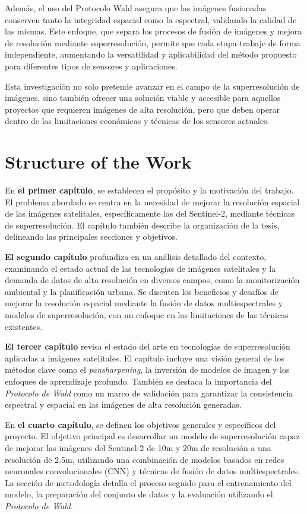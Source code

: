 Además, el uso del Protocolo Wald asegura que las imágenes fusionadas conserven tanto la integridad espacial como la espectral, validando la calidad de las mismas. Este enfoque, que separa los procesos de fusión de imágenes y mejora de resolución mediante superresolución, permite que cada etapa trabaje de forma independiente, aumentando la versatilidad y aplicabilidad del método propuesto para diferentes tipos de sensores y aplicaciones.

Esta investigación no solo pretende avanzar en el campo de la superresolución de imágenes, sino también ofrecer una solución viable y accesible para aquellos proyectos que requieren imágenes de alta resolución, pero que deben operar dentro de las limitaciones económicas y técnicas de los sensores actuales.


\section{Structure of the Work}


En \textbf{el primer capítulo}, se establecen el propósito y la motivación del trabajo. El problema abordado se centra en la necesidad de mejorar la resolución espacial de las imágenes satelitales, específicamente las del Sentinel-2, mediante técnicas de superresolución. El capítulo también describe la organización de la tesis, delineando las principales secciones y objetivos.

\textbf{El segundo capítulo} profundiza en un análisis detallado del contexto, examinando el estado actual de las tecnologías de imágenes satelitales y la demanda de datos de alta resolución en diversos campos, como la monitorización ambiental y la planificación urbana. Se discuten los beneficios y desafíos de mejorar la resolución espacial mediante la fusión de datos multiespectrales y modelos de superresolución, con un enfoque en las limitaciones de las técnicas existentes.

\textbf{El tercer capítulo} revisa el estado del arte en tecnologías de superresolución aplicadas a imágenes satelitales. El capítulo incluye una visión general de los métodos clave como el \textit{pansharpening}, la inversión de modelos de imagen y los enfoques de aprendizaje profundo. También se destaca la importancia del \textit{Protocolo de Wald} como un marco de validación para garantizar la consistencia espectral y espacial en las imágenes de alta resolución generadas.

En \textbf{el cuarto capítulo}, se definen los objetivos generales y específicos del proyecto. El objetivo principal es desarrollar un modelo de superresolución capaz de mejorar las imágenes del Sentinel-2 de 10m y 20m de resolución a una resolución de 2.5m, utilizando una combinación de modelos basados en redes neuronales convolucionales (CNN) y técnicas de fusión de datos multiespectrales. La sección de metodología detalla el proceso seguido para el entrenamiento del modelo, la preparación del conjunto de datos y la evaluación utilizando el \textit{Protocolo de Wald}.

